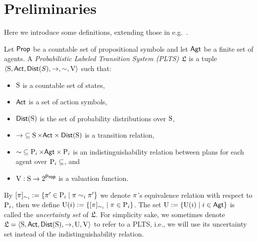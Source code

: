 \section{Preliminaries}
\label{sec:preliminaries}

Here we introduce some definitions, extending those in e.g.~\cite{AFSVQ21}.

\begin{definition}\label{def:plts}
    Let $\PROP$ be a countable set of propositional symbols and let $\AGT$ be a finite set of agents.  
    A \emph{Probabilistic Labeled Transition System (PLTS)} $\model$ is a tuple
    $\tup{\S,\ACT,\dist(S),\ra,\sim,\V}$ such that:
    \begin{itemize}
        \item $\S$ is a countable set of states,
        \item $\ACT$ is a set of action symbols,
        \item $\dist(\S)$ is the set of probability distributions over $\S$,
        \item ${\ra} \subseteq \S \times \ACT \times \dist(\S)$ is a transition relation,
        \item ${\sim}\subseteq \DS{i} \times \AGT \times \DS{i}$ is an indistinguishability relation between plans for each agent over $\DS{i}\subseteq$, and
        \item $\V: \S \ra 2^\PROP$ is a valuation function.
    \end{itemize}
    By $[\plan]_{\sim_i}:=\set{\plan' \in \DS{i} \mid \plan \sim_i \plan'}$ we denote $\plan$'s equivalence relation with respect to $\DS{i}$, then we define $\Unc(i) := \set{[\plan]_{\sim_i} \mid \plan\in\DS{i}}$. The set $\Unc:=\set{\Unc(i) \mid i\in\AGT}$ is called the \emph{uncertainty set} of $\model$. For simplicity sake, we sometimes denote $\model=\tup{\S,\ACT,\dist(\S),\ra,\Unc,\V}$ to refer to a PLTS, i.e., we will use its uncertainty set instead of the indistinguishability relation.
\end{definition}

